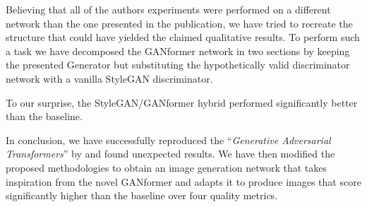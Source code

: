 \documentclass{article}
\begin{document}
Believing that all of the authors experiments were performed on a different network than the one 
presented in the publication, we have tried to recreate the structure that could have yielded the claimed qualitative results.
To perform such a task we have decomposed the GANformer network in two sections by keeping 
the presented Generator but substituting the hypothetically valid discriminator network with a vanilla StyleGAN discriminator.

To our surprise, the StyleGAN/GANformer hybrid performed significantly better than the baseline. 

In conclusion, we have successfully reproduced the ``\emph{Generative Adversarial Transformers}'' 
by \citet{hudson2021generative} and found unexpected results.
We have then modified the proposed methodologies to obtain an image generation network that 
takes inspiration from the novel GANformer and adapts it to produce images that score significantly higher than the baseline over four quality metrics.

%
%
%
%
%
%
%
\end{document}
